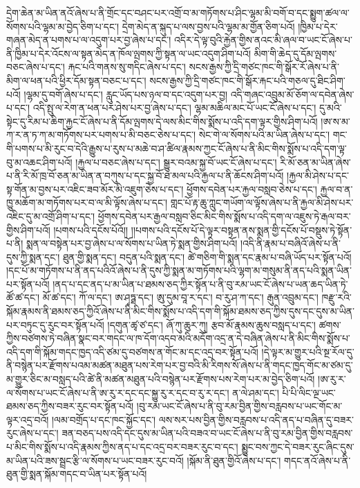 དྲེག་ཆེན་མ་ཡིན་ནའོ་ཞེས་པ་ནི་གྲོང་དང་བཤང་པར་འགྲོ་བ་མ་གཏོགས་པ་ཤིང་ལྷམ་མི་བགོ་བ་དང་སྨྱུག་ཚལ་ལ་སོགས་པའི་ལྷམ་མ་བྱེད་ཅིག་པ་དང་། དྲེག་མེད་ན་སྐུད་པ་ལས་བྱས་པའི་ལྷམ་མ་གྱོན་ཅིག་པའོ། །ཁྱིམ་པ་དེར་གཞན་མེད་ན་པགས་པ་ལ་འདུག་པར་བྱ་ཞེས་པ་དང་། འདིར་དེ་ལྟ་བུའི་རྐྱེན་གྱིས་ནའང་མི་ཞལ་བ་ཡང་ངོ་ཞེས་པ་ནི་ཁྱིམ་པ་དེར་འོངས་ལ་སྟན་མེད་ན་ཁོལ་ལྤགས་ཀྱི་སྟན་ལ་ཡང་འདུག་ཤིག་པའོ། མིག་གི་ཆེད་དུ་དོམ་ལྤགས་བཅང་ཞེས་པ་དང་། རྐང་པའི་གནས་སུ་གདིང་ཞེས་པ་དང་། སངས་རྒྱས་ཀྱི་དྲི་གཙང་ཁང་གི་སྒོར་རོ་ཞེས་པ་ནི་མིག་ལ་ཕན་པའི་ཕྱིར་དོམ་སྟན་བཅང་པ་དང་། སངས་རྒྱས་ཀྱི་དྲི་གཙང་ཁང་གི་སྒོར་རྐང་པའི་གཅལ་དུ་ཐིང་ཤིག་པའོ། །ལྷམ་དུ་བགོ་ཞེས་པ་དང་། རླུང་ཡོད་པས་ཉལ་བ་དང་འདུག་པར་བྱ། འདི་གཞང་འབྲུམ་མོ་ཅོག་ལ་དབེན་ཞེས་པ་དང་། འདི་སྤུ་ལ་རེག་ན་ཕན་པར་ཤེས་པར་བྱ་ཞེས་པ་དང་། ལྷམ་མཆིལ་མང་པོ་ཡང་ངོ་ཞེས་པ་དང་། དུ་མའི་སྟེང་དུ་རིམ་པ་ཆིག་རྐྱང་ངོ་ཞེས་པ་ནི་དོམ་ལྤགས་དེ་ལས་མིང་གིས་སྨོས་པ་འདི་དག་ལྟར་གྱིས་ཤིག་པའོ། །ཨ་ས་མ་ཀ་ར་ན་ཏ་ཀ་མ་གཏོགས་པར་པགས་པ་མི་བཅང་ཅེས་པ་དང་། སེང་གེ་ལ་སོགས་པའི་མ་ཡིན་ཞེས་པ་དང་། གང་གི་པགས་པ་མི་རུང་བ་དེའི་རྒྱུས་པ་རུས་པ་མཆེ་བ་ཤ་ཚིལ་རྣམས་ཀྱང་ངོ་ཞེས་པ་ནི་མིང་གིས་སྨོས་པ་འདི་དག་ལྟ་བུ་མ་འཆང་ཤིག་པའོ། །རྐྱལ་པ་བཅང་ཞེས་པ་དང་། སྒྱུར་བའམ་སྐྱ་བོ་ཡང་ངོ་ཞེས་པ་དང་། རི་མོ་ཅན་མ་ཡིན་ཞེས་པ་ནི་རི་མོ་ཁྲ་བོ་ཅན་མ་ཡིན་ན་བཀུས་པ་དང་སྐྱ་བོ་ཐ་མལ་པའི་རྐྱལ་པ་ནི་ཆོངས་ཤིག་པའོ། །རྐྱལ་མི་ཤེས་པ་དང་སྟ་གོན་མ་བྱས་པར་འཇིང་ཟབ་མོར་མི་འཇུག་ཅེས་པ་དང་། ཕྱོགས་དབེན་པར་རྐྱལ་བསླབ་ཅེས་པ་དང་། རྐྱལ་བ་ན་ཁྱུ་མཆོག་མ་གཏོགས་པར་བ་ལ་མི་ལྟོས་ཞེས་པ་དང་། གླང་པོ་རྟ་ཆུ་ཀླུང་གཡོག་ལ་ལྟོས་ཞེས་པ་ནི་རྐྱལ་མི་ཤེས་པར་འཇིང་དུ་མ་འགྲོ་ཤིག་པ་དང་། ཕྱོགས་དབེན་པར་རྒྱལ་བསླབ་ཅིང་མིང་གིས་སྨོས་པ་འདི་དག་ལ་འཇུས་ཏེ་རྒལ་བར་གྱིས་ཤིག་པའོ། །པགས་པའི་དངོས་པོའོ།། །།པགས་པའི་དངོས་པོ་དེ་ལྟར་བསྟན་ནས་སྨན་གྱི་དངོས་པོ་བསྡུས་ཏེ་སྟོན་པ་ནི། སྨན་ལ་བསྟེན་པར་བྱ་ཞེས་པ་ལ་སོགས་པ་ཡིན་ཏེ་སྨན་གྱིས་ཤིག་པའོ། །འདི་ནི་རྣམ་པ་བཞིའོ་ཞེས་པ་ནི་དུས་ཀྱི་སྨན་དང་། ཐུན་གྱི་སྨན་དང་། བདུན་པའི་སྨན་དང་། ཚེ་གཅིག་གི་སྨན་དང་རྣམ་པ་བཞི་ཡོད་པར་སྟོན་པའོ། །དང་པོ་མ་གཏོགས་པ་ནི་ནད་པའིའོ་ཞེས་པ་ནི་དུས་ཀྱི་སྨན་མ་གཏོགས་པའི་ལྷག་མ་གསུམ་ནི་ནད་པའི་སྨན་ཡིན་པར་སྟོན་པའོ། །ནད་པ་དང་ནད་པ་མ་ཡིན་པ་ཐམས་ཅད་ཀྱིར་སྟོན་པ་ནི་བུ་རམ་ཡང་ངོ་ཞེས་པ་ཡན་ཆད་ཡིན་ཏེ་ཚོ་ཚ་དང་། མོ་ཚ་དང་། ཀོ་ལ་དང་། ཨ་ཤྭཏྠ་དང་། ཨུ་དུམ་བཱ་ར་དང་། བ་རུ་ཤ་ཀ་དང་། རྒུན་འབྲུམ་དང་། ཁརྫུ་རའི་སྐོམ་རྣམས་ནི་ཐམས་ཅད་ཀྱིའོ་ཞེས་པ་ནི་མིང་གིས་སྨོས་པ་འདི་དག་གི་སྐོམ་ཐམས་ཅད་ཀྱིས་དུས་དང་དུས་མ་ཡིན་པར་བཏུང་དུ་རུང་བར་སྟོན་པའོ། །དགུན་ཚྭ་ཙ་དང་། ཞོ་ཀུ་ཆུར་ཀུ། རྩབ་མོ་རྣམས་ཆུས་བསླད་པ་དང་། ཚགས་ཀྱིས་བཙགས་ཏེ་བཞིན་སྣང་བར་གདང་ལ་ཁ་དོག་འདབ་མའི་མདོག་འདྲ་ན་དེ་བཞིན་ཞེས་པ་ནི་མིང་གིས་སྨོས་པ་འདི་དག་གི་སྐོམ་གདང་ཁྱད་འདི་ཙམ་དུ་བཙགས་ན་གོང་མ་དང་འདྲ་བར་སྟོན་པའོ། །དེ་ལྟར་མ་གྱུར་པའི་སྔ་རོལ་དུ་ནི་བསྙེན་པར་རྫོགས་པའམ་མཚན་མཐུན་པས་རེག་པར་བྱ་བའི་མི་རིགས་སོ་ཞེས་པ་ནི་གདང་ཁྱད་གོང་མ་ཙམ་དུ་མ་གྱུར་ཅིང་མ་བསླད་པའི་ཚེ་ནི་མཚན་མཐུན་པའི་བསྙེན་པར་རྫོགས་པས་རེག་པར་མ་བྱེད་ཅིག་པའོ། །ཨ་རུ་ར་ལ་སོགས་པ་ཡང་ངོ་ཞེས་པ་ནི་ཨ་རུ་ར་དང་དང་སྐྱུ་རུ་ར་དང་བ་རུ་ར་དང་། ན་ལེ་ཤམ་དང་། པི་པི་ལིང་ལྔ་ཡང་ཐམས་ཅད་ཀྱིས་བཟར་རུང་བར་སྟོན་པའོ། །བུ་རམ་ཡང་ངོ་ཞེས་པ་ནི་བུ་རམ་བྱིན་གྱིས་བརླབས་པ་ཡང་གོང་མ་ལྟར་འདྲ་བའོ། །ལམ་བགྲོད་པ་དང་ཁང་སྐྱོང་དང་། ལས་སར་པས་བྱིན་གྱིས་བརླབས་པ་འདི་ནད་པ་བཞིན་དུ་བཟར་རུང་ཞེས་པ་དང་། ཟན་བཅད་པས་འདི་དང་དུས་མ་ཡིན་པའི་བཟའ་བ་ཡང་ངོ་ཞེས་པ་ནི་བུ་རམ་བྱིན་གྱིས་བརླབས་པ་མིང་གིས་སྨོས་པ་འདི་རྣམས་ཀྱིས་ནད་པ་དང་འདྲ་བར་བཟར་རུང་བ་དང་། སྨྱུང་བས་ཀྱང་དེ་བཟར་རུང་ཞིང་དུས་མ་ཡིན་པའི་ཟས་སྦྲང་རྩི་ལ་སོགས་པ་ཡང་བཟར་རུང་བའོ། །སྐོམ་ནི་ཐུན་གྱིའོ་ཞེས་པ་དང་། གདང་ནའོ་ཞེས་པ་ནི་ཐུན་གྱི་སྨན་སྐོམ་གདང་བ་ཡིན་པར་སྟོན་པའོ། 